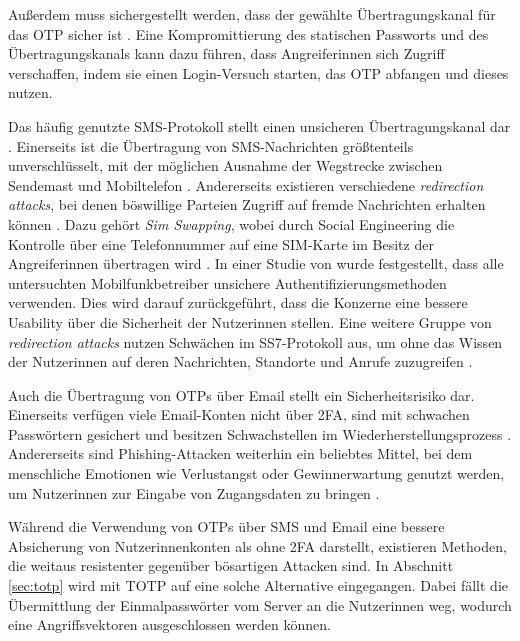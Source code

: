 \pskip
Außerdem muss sichergestellt werden, dass der gewählte Übertragungskanal für das \ac{OTP} sicher ist \parencite{abhishekComprehensiveStudy2013}. Eine Kompromittierung des statischen Passworts und des Übertragungskanals kann dazu führen, dass Angreiferinnen sich Zugriff verschaffen, indem sie einen Login-Versuch starten, das \ac{OTP} abfangen und dieses nutzen.

Das häufig genutzte SMS-Protokoll stellt einen unsicheren Übertragungskanal dar \parencite{peetersSMSOTP2022}. Einerseits ist die Übertragung von SMS-Nachrichten größtenteils unverschlüsselt, mit der möglichen Ausnahme der Wegstrecke zwischen Sendemast und Mobiltelefon \parencite{peetersSMSOTP2022}. Andererseits existieren verschiedene \textit{redirection attacks}, bei denen böswillige Parteien Zugriff auf fremde Nachrichten erhalten können \parencite{peetersSMSOTP2022}. Dazu gehört \textit{Sim Swapping}, wobei durch Social Engineering die Kontrolle über eine Telefonnummer auf eine SIM-Karte im Besitz der Angreiferinnen übertragen wird \parencite{leeEmpiricalStudy2020}. In einer Studie von \textcite{leeEmpiricalStudy2020} wurde festgestellt, dass alle untersuchten Mobilfunkbetreiber unsichere Authentifizierungsmethoden verwenden. Dies wird darauf zurückgeführt, dass die Konzerne eine bessere Usability über die Sicherheit der Nutzerinnen stellen. Eine weitere Gruppe von \textit{redirection attacks} nutzen Schwächen im \ac{SS7}-Protokoll aus, um ohne das Wissen der Nutzerinnen auf deren Nachrichten, Standorte und Anrufe zuzugreifen \parencite{ullahSS7Vulnerabilities2020}.

Auch die Übertragung von \acp{OTP} über Email stellt ein Sicherheitsrisiko dar. Einerseits verfügen viele Email-Konten nicht über \ac{2FA}, sind mit schwachen Passwörtern gesichert und besitzen Schwachstellen im Wiederherstellungsprozess \parencite{khannaAnatomyCompromising2012}. Andererseits sind Phishing-Attacken weiterhin ein beliebtes Mittel, bei dem menschliche Emotionen wie Verlustangst oder Gewinnerwartung genutzt werden, um Nutzerinnen zur Eingabe von Zugangsdaten zu bringen \parencite{goelGotPhished2017}.

\pskip
Während die Verwendung von \acp{OTP} über SMS und Email eine bessere Absicherung von Nutzerinnenkonten als ohne \ac{2FA} darstellt, existieren Methoden, die weitaus resistenter gegenüber bösartigen Attacken sind. In Abschnitt \ref{sec:totp} wird mit \ac{TOTP} auf eine solche Alternative eingegangen. Dabei fällt die Übermittlung der Einmalpasswörter vom Server an die Nutzerinnen weg, wodurch eine Angriffsvektoren ausgeschlossen werden können.

